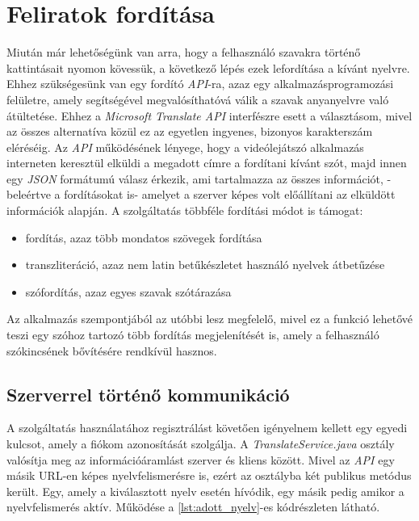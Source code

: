 \section{Feliratok fordítása}

Miután már lehetőségünk van arra, hogy a felhasználó szavakra történő kattintásait nyomon kövessük, a következő lépés ezek lefordítása a kívánt nyelvre. Ehhez szükségesünk van egy fordító \textit{API}-ra, azaz egy alkalmazásprogramozási felületre, amely segítségével megvalósíthatóvá válik a szavak anyanyelvre való átültetése. Ehhez a \textit{Microsoft Translate API} interfészre esett a választásom, mivel az összes alternatíva közül ez az egyetlen ingyenes, bizonyos karakterszám eléréséig. Az \textit{API} működésének lényege, hogy a videólejátszó alkalmazás interneten keresztül elküldi a megadott címre a fordítani kívánt szót, majd innen egy \textit{JSON} formátumú válasz érkezik, ami tartalmazza az összes információt, -beleértve a fordításokat is- amelyet a szerver képes volt előállítani az elküldött információk alapján.
A szolgáltatás többféle fordítási módot is támogat:
\begin{itemize}[noitemsep]
\item fordítás, azaz több mondatos szövegek fordítása
\item transzliteráció, azaz nem latin betűkészletet használó nyelvek átbetűzése
\item szófordítás, azaz egyes szavak szótárazása
\end{itemize}
Az alkalmazás szempontjából az utóbbi lesz megfelelő, mivel ez a funkció lehetővé teszi egy szóhoz tartozó több fordítás megjelenítését is, amely a felhasználó szókincsének bővítésére rendkívül hasznos.

\subsection{Szerverrel történő kommunikáció}
A szolgáltatás használatához regisztrálást követően igényelnem kellett egy egyedi kulcsot, amely a fiókom azonosítását szolgálja. A \textit{TranslateService.java} osztály valósítja meg az információáramlást szerver és kliens között. Mivel az \textit{API} egy másik URL-en képes nyelvfelismerésre is, ezért az osztályba két publikus metódus került. Egy, amely a kiválasztott nyelv esetén hívódik, egy másik pedig amikor a nyelvfelismerés aktív. Működése a \ref{lst:adott_nyelv}-es kódrészleten látható. 

